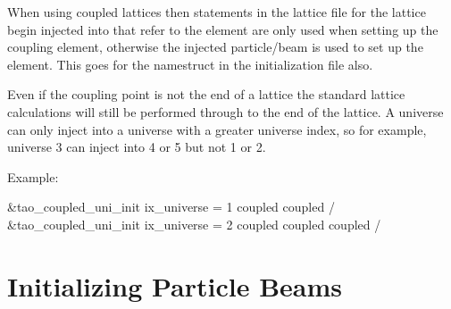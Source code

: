 When using coupled lattices then statements in the lattice file for
the lattice begin injected into that refer to the 
element are only used when setting up the coupling element, otherwise
the injected particle/beam is used to set up the 
element. This goes for the  namestruct in the
initialization file also.

Even if the coupling point is not the end of a lattice the standard lattice
calculations will still be performed through to the end of the
lattice.  A universe can only inject into a universe with a greater
universe index, so for example, universe 3 can inject into 4 or 5 but
not 1 or 2.

Example:
\begin{example}
  &tao_coupled_uni_init
    ix_universe = 1
    coupled%
    coupled%
  /
  &tao_coupled_uni_init
    ix_universe = 2
    coupled%
    coupled%
    coupled%
  /
\end{example}

\section{Initializing Particle Beams}
\label{s:beam_init}

